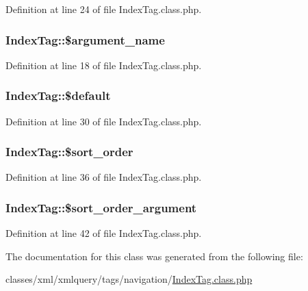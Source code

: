 Definition at line 24 of file Index\-Tag.\-class.\-php.

\hypertarget{classIndexTag_a92f6892b11fed081293fdaabb58f36a0}{
\subsubsection[{\$argument\-\_\-name}]{\setlength{\rightskip}{0pt plus 5cm}Index\-Tag\-::\$argument\-\_\-name}}\label{classIndexTag_a92f6892b11fed081293fdaabb58f36a0}


Definition at line 18 of file Index\-Tag.\-class.\-php.

\hypertarget{classIndexTag_ae24a36bb56ebc33a9161a64b12f92f18}{
\subsubsection[{\$default}]{\setlength{\rightskip}{0pt plus 5cm}Index\-Tag\-::\$default}}\label{classIndexTag_ae24a36bb56ebc33a9161a64b12f92f18}


Definition at line 30 of file Index\-Tag.\-class.\-php.

\hypertarget{classIndexTag_a68336fd5e6a3fa09e2659359cce027fb}{
\subsubsection[{\$sort\-\_\-order}]{\setlength{\rightskip}{0pt plus 5cm}Index\-Tag\-::\$sort\-\_\-order}}\label{classIndexTag_a68336fd5e6a3fa09e2659359cce027fb}


Definition at line 36 of file Index\-Tag.\-class.\-php.

\hypertarget{classIndexTag_af25bb5754a767188b72ee872e35414e6}{
\subsubsection[{\$sort\-\_\-order\-\_\-argument}]{\setlength{\rightskip}{0pt plus 5cm}Index\-Tag\-::\$sort\-\_\-order\-\_\-argument}}\label{classIndexTag_af25bb5754a767188b72ee872e35414e6}


Definition at line 42 of file Index\-Tag.\-class.\-php.



The documentation for this class was generated from the following file\-:\begin{DoxyCompactItemize}
\item 
classes/xml/xmlquery/tags/navigation/\hyperlink{IndexTag_8class_8php}{Index\-Tag.\-class.\-php}\end{DoxyCompactItemize}
